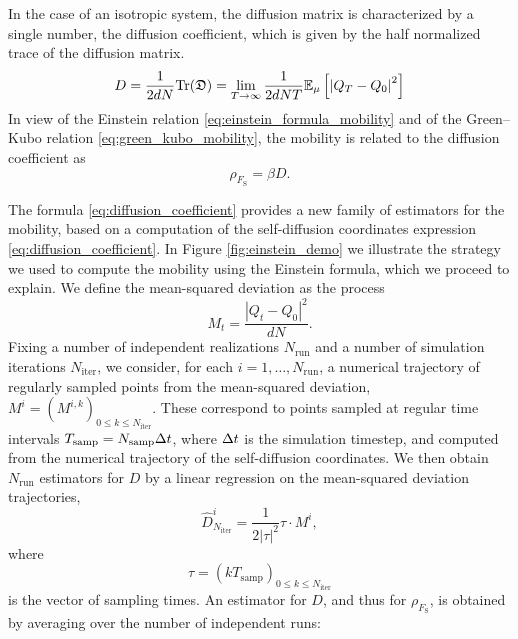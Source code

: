 \begin{remark}
    In the case of an isotropic system, the diffusion matrix is characterized by a single number, the diffusion coefficient, which is given by the half normalized trace of the diffusion matrix.
    \begin{equation}
        \label{eq:diffusion_coefficient}
        D=\frac{1}{2dN}\mathrm{Tr}(\mathfrak D)=\underset{T\to\infty}{\lim}\,\frac{1}{2dNT}\mathbb{E}_\mu\left[\left|Q_T-Q_0\right|^2\right]
    \end{equation}
    In view of the Einstein relation \eqref{eq:einstein_formula_mobility} and of the Green--Kubo relation \eqref{eq:green_kubo_mobility}, the mobility is related to the diffusion coefficient as
    \begin{equation}
        \label{eq:mobility_from_einstein}
        \rho_{F_{\mathrm{S}}}=\beta D.
    \end{equation}
\end{remark}
    The formula \eqref{eq:diffusion_coefficient} provides a new family of estimators for the mobility, based on a computation of the self-diffusion coordinates expression \eqref{eq:diffusion_coefficient}.
    In Figure \ref{fig:einstein_demo} we illustrate the strategy we used to compute the mobility using the Einstein formula, which we proceed to explain.
    We define the mean-squared deviation as the process
    \begin{equation}
        \label{eq:mean_squared_deviation}
        M_t=\frac{|Q_t-Q_0|^2}{dN}.
    \end{equation}
    Fixing a number of independent realizations $N_{\mathrm{run}}$ and a number of simulation iterations $N_{\mathrm{iter}}$, we consider, for each $i=1,\dots,N_{\mathrm{run}}$, a numerical trajectory of regularly sampled points from the mean-squared deviation,
    $M^i=(M^{i,k})_{0\leq k\leq N_{\mathrm{iter}}}.$ 
    These correspond to points sampled at regular time intervals $T_{\mathrm{samp}}=N_{\mathrm{samp}}{\Delta t}$, where ${\Delta t}$ is the simulation timestep, and computed from the numerical trajectory of the self-diffusion coordinates.
    We then obtain $N_{\mathrm{run}}$ estimators for $D$ by a linear regression on the mean-squared deviation trajectories, 
    \begin{equation}
        \widehat{D}^i_{N_{\mathrm{iter}}}= \frac{1}{2|\tau|^2} \tau\cdot M^i,
    \end{equation}
    where \[\tau=(kT_{\mathrm{samp}})_{0\leq k\leq N_{\mathrm{iter}}}\]
    is the vector of sampling times. An estimator for $D$, and thus for $\rho_{F_{\mathrm{S}}}$, is obtained by averaging over the number of independent runs:

